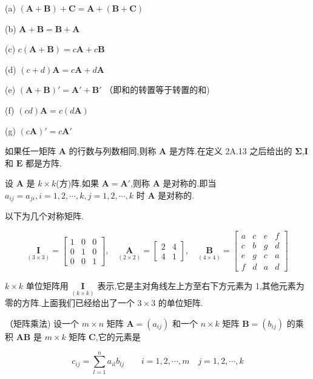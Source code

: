 (a) $(\bm{A} + \bm{B}) + \bm{C} = \bm{A} + (\bm{B} + \bm{C})$

(b) $\bm{A} + \bm{B} = \bm{B} + \bm{A}$

(c) $c(\bm{A} + \bm{B}) = c\bm{A} + c\bm{B}$

(d) $(c + d)\bm{A} = c\bm{A} + d\bm{A}$

(e) $(\bm{A} + \bm{B})' = \bm{A}' + \bm{B}'$ \quad （即和的转置等于转置的和)

(f) $(cd)\bm{A} = c(d\bm{A})$

(g) $(c\bm{A})' = c\bm{A}'$

 \quad 如果任一矩阵 $\bm{A}$ 的行数与列数相同,则称 $\bm{A}$ 是方阵.在定义 2A.13 之后给出的 $\bm{\Sigma}$,$\bm{I}$ 和 $\bm{E}$ 都是方阵.

 \quad 设 $\bm{A}$ 是 $k \times k$(方)阵.如果 $\bm{A} = \bm{A}'$,则称 $\bm{A}$ 是对称的.即当 $a_{ij} = a_{ji} ,i=1,2,\cdots ,k,j=1,2,\cdots ,k$ 时 $\bm{A}$ 是对称的.

以下为几个对称矩阵.

\[
\underset{(3 \times 3)}{\bm{I}} = \begin{bmatrix} 1 & 0 & 0 \\ 0 & 1 & 0 \\ 0 & 0 & 1 \end{bmatrix}, \quad
\underset{(2 \times 2)}{\bm{A}} = \begin{bmatrix} 2 & 4 \\ 4 & 1 \end{bmatrix}, \quad
\underset{(4 \times 4)}{\bm{B}} = \begin{bmatrix} a & c & e & f \\ c & b & g & d \\ e & g & c & a \\ f & d & a & d \end{bmatrix}
\]

 \quad $k \times k$ 单位矩阵用 $\underset{(k \times k)}{\bm{I}}$ 表示,它是主对角线左上方至右下方元素为 1,其他元素为零的方阵.上面我们已经给出了一个 $3 \times 3$ 的单位矩阵.

 \quad （矩阵乘法) \quad 设一个 $m \times n$ 矩阵 $\bm{A} = (a_{ij})$ 和一个 $n \times k$ 矩阵 $\bm{B} = (b_{ij})$ 的乘积 $\bm{A}\bm{B}$ 是 $m \times k$ 矩阵 $\bm{C}$,它的元素是

\[
c_{ij} = \sum_{l=1}^{n} a_{il} b_{lj} \qquad i=1,2,\cdots ,m \quad j=1,2,\cdots ,k
\]
